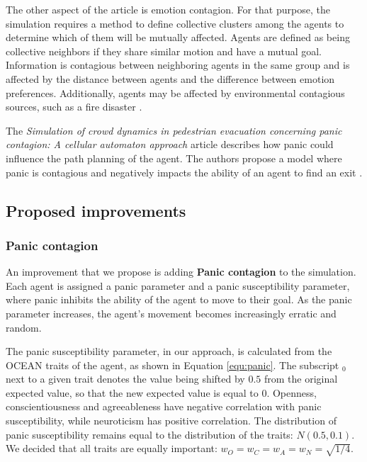 \documentclass[9pt]{pnas-new}
\begin{document}
The other aspect of the article is emotion contagion. For that purpose, the simulation requires a method to define collective clusters among the agents to determine which of them will be mutually affected. Agents are defined as being collective neighbors if they share similar motion and have a mutual goal. Information is contagious between neighboring agents in the same group and is affected by the distance between agents and the difference between emotion preferences. Additionally, agents may be affected by environmental contagious sources, such as a fire disaster \cite{Wu_Huang_Tian_Yan_Yu_2024}.  

The \textit{Simulation of crowd dynamics in pedestrian evacuation concerning panic contagion: A cellular automaton approach} article describes how panic could influence the path planning of the agent.
The authors propose a model where panic is contagious and negatively impacts the ability of an agent to find an exit \cite{Wang_2022}.
\subsection{Proposed improvements}

\subsubsection{Panic contagion}
An improvement that we propose is adding \textbf{Panic contagion} to the simulation. Each agent is assigned a panic parameter and a panic susceptibility parameter, where panic inhibits the ability of the agent to move to their goal. As the panic parameter increases, the agent's movement becomes increasingly erratic and random.

The panic susceptibility parameter, in our approach, is calculated from the OCEAN traits of the agent, as shown in Equation \ref{equ:panic}. The subscript $_0$ next to a given trait denotes the value being shifted by $0.5$ from the original expected value, so that the new expected value is equal to $0$. Openness, conscientiousness and agreeableness have negative correlation with panic susceptibility, while neuroticism has positive correlation. The distribution of panic susceptibility remains equal to the distribution of the traits: $N(0.5,0.1)$. We decided that all traits are equally important: \(w_O = w_C= w_A= w_N= \sqrt{1/4}\).
\end{document}
